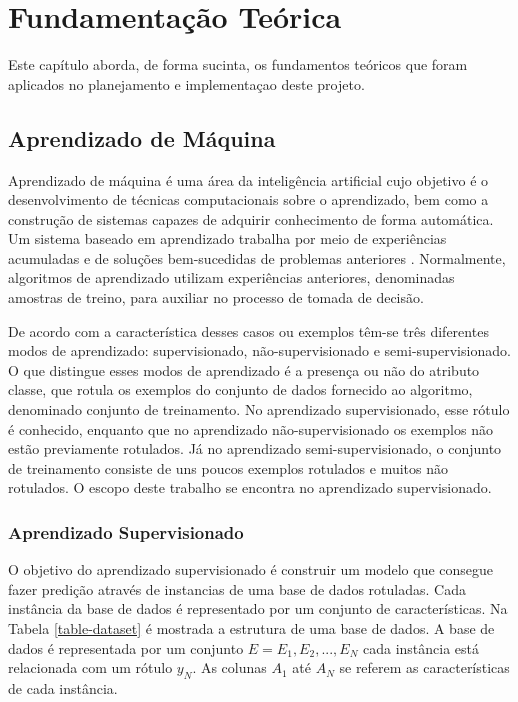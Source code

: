 \chapter{Fundamentação Teórica} \label{cap2}


Este capítulo aborda, de forma sucinta, os fundamentos teóricos que foram aplicados no planejamento e implementaçao deste projeto.



\section{Aprendizado de Máquina}

Aprendizado de máquina é uma área da inteligência artificial cujo objetivo é o desenvolvimento de técnicas computacionais sobre o aprendizado, bem como a construção de sistemas capazes de adquirir conhecimento de forma automática. Um sistema baseado em aprendizado trabalha por meio de experiências acumuladas e de soluções bem-sucedidas de problemas anteriores  \cite{monard2003}. Normalmente, algoritmos de aprendizado utilizam experiências anteriores, denominadas amostras de treino, para auxiliar no processo de tomada de decisão.  

De acordo com a característica desses casos ou exemplos têm-se três diferentes modos de aprendizado: supervisionado, não-supervisionado e semi-supervisionado. O que distingue esses modos de aprendizado é a presença ou não do atributo classe, que rotula os exemplos do conjunto de dados fornecido ao algoritmo, denominado conjunto de treinamento. No aprendizado supervisionado, esse rótulo é conhecido, enquanto que no aprendizado não-supervisionado os exemplos não estão previamente rotulados. Já no aprendizado semi-supervisionado, o conjunto de treinamento consiste de uns poucos exemplos rotulados e muitos não rotulados\cite{chappelle2006}. O escopo deste trabalho se encontra no aprendizado supervisionado. 


\subsection{Aprendizado Supervisionado}
O objetivo do aprendizado supervisionado é construir um modelo que consegue fazer predição através de instancias de uma base de dados rotuladas. Cada instância da base de dados é representado por um conjunto de características. Na Tabela \ref{table-dataset} é mostrada a estrutura de uma base de dados.
A base de dados é representada por um conjunto $E={E_1,E_2,...,E_N}$  cada instância está relacionada com um rótulo $y_N$. As colunas $A_1$ até $A_N$ se referem as características de cada instância.

